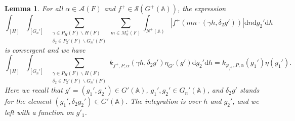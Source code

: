 \documentclass[letterpaper,11pt]{amsart}
\newcommand{\bA}{\mathbb{A}}
\newcommand{\cA}{\mathcal{A}}
\newcommand{\cS}{\mathcal{S}}
\newcommand{\rd}{\mathrm{d}}
\newcommand{\<}{\negthickspace}
\theoremstyle{definition}
\theoremstyle{plain}
\newtheorem{lemma}[definition]{Lemma}
\theoremstyle{remark}
\numberwithin{equation}{section}
\begin{document}
\begin{lemma}   \label{lem:geometric_linear_convergence}
For all $\alpha \in \cA(F)$ and $f^+ \in \cS(G^+(\bA))$, the expression
    \[
    \int_{[H]} \int_{[G_n']}
    \sum_{ \substack{ \gamma \in P_H(F) \backslash H(F) \\
    \delta_2 \in P_2'(F) \backslash G_n'(F) }}
    \sum_{m \in M_{\alpha}^+(F)} \int_{N^+(\bA)}
    \left| f^+(mn \cdot (\gamma h, \delta_2 g')) \right| \rd n \rd g_2' \rd h
    \]
is convergent and we have
    \begin{equation}    \label{eq:geo_descent_GL_step_1}
    \int_{[H]} \int_{[G_n']}
    \sum_{ \substack{ \gamma \in P_H(F) \backslash H(F) \\
    \delta_2 \in P_2'(F) \backslash G_n'(F) }}
    k_{f^+, P, \alpha}(\gamma h,\delta_2 g') \eta_{G'}(g') \rd g_2' \rd h =
    k_{\varphi_{f^+}, P, \alpha}(g_1') \eta(g_1').
    \end{equation}
Here we recall that $g' = (g_1', g_2') \in G'(\bA)$, $g_1', g_2' \in G_n'(\bA)$, and $\delta_2 g'$ stands for the element $(g_1', \delta_2 g_2') \in G'(\bA)$. The integration is over $h$ and $g_2'$, and we left with a function on $g'_1$.
\end{lemma}
\end{document}

